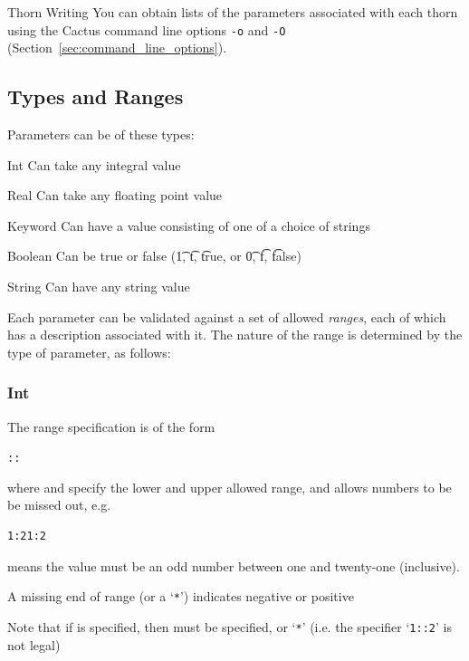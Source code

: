 \begin{cactuspart}{Thorn Writing}
You can obtain lists of the parameters associated with
each thorn using the Cactus command line options \texttt{-o} and \texttt{-O}
(Section~\ref{sec:command_line_options}).



\subsection{Types and Ranges}
\label{sec:Parameters.Types_and_Ranges}

Parameters can be of these types:

\begin{Lentry}
\item[Int]  Can take any integral value
\item[Real] Can take any floating point value
\item[Keyword] Can have a value consisting of one of a choice of strings
\item[Boolean] Can be true or false ({\t 1}, {\t t}, {\t true}, or
{\t 0}, {\t f}, {\t false})
\item[String] Can have any string value
\end{Lentry}

Each parameter can be validated against a set of allowed
\textit{ranges}, each of which has a description associated with it.
The nature
of the range is determined by the type of parameter, as follows:

\subsubsection{Int}

The range specification is of the form

\begin{alltt}
::
\end{alltt}

where  and  specify the lower and upper allowed
range, and  allows numbers to be be missed out, e.g.\
\begin{verbatim}
1:21:2
\end{verbatim}
means the value must be an odd number between one and twenty-one
(inclusive).

A missing end of range (or a `\texttt{*}') indicates negative or positive

Note that if  is specified, then  must be specified, or `\texttt{*}' (i.e.
the specifier `\texttt{1::2}' is not legal)


\end{cactuspart}
